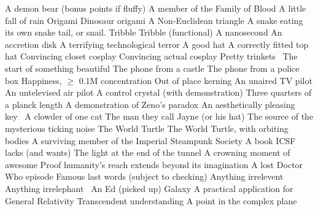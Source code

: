 \begin{multicols}{2}
\begin{small}
\begin{tabbing}
           {A demon bear (bonus points if fluffy)}
           {A member of the Family of Blood}
           {A little fall of rain}
           {Origami}
          {Dinosaur origami}
           {A Non-Euclidean triangle}
           {A snake eating its own snake tail, or snail.}
           {Tribble}
          {Tribble (functional)}
           {A nanosecond}
          {An accretion disk}
          {A terrifying technological terror}
           {A good hat}
           {A correctly fitted top hat}
           {Convincing closet cosplay}
          {Convincing actual cosplay}
          {Pretty trinkets~\FD}
           {The start of something beautiful}
          {The phone from a castle}
          {The phone from a police box}
          {Happiness, $\ge$ 0.1M concentration}
          {Out of place kerning}
          {An unaired TV pilot}
          {An untelevised air pilot}
          {A control crystal (with demonstration)}
          {Three quarters of a planck length}
          {A demonstration of Zeno's paradox}
          {An aesthetically pleasing key~\FD}
          {A clowder of one cat}
           {The man they call Jayne (or his hat)}
         {The source of the mysterious ticking noise}
         {The World Turtle}
         {The World Turtle, with orbiting bodies}
          {A surviving member of the Imperial Steampunk Society}
          {A book ICSF lacks (and wants)}
           {The light at the end of the tunnel}
           {A crowning moment of awesome}
          {Proof humanity's reach extends beyond its imagination}
          {A lost Doctor Who episode}
           {Famous last words (subject to checking)}
          {Anything irrelevent~\E}
          {Anything irrelephant~\E}
           {An Ed (picked up)}
           {Galaxy}
           {A practical application for General Relativity}
           {Transcendent understanding}
          {A point in the complex plane}

\end{tabbing}
\end{small}
\end{multicols}
